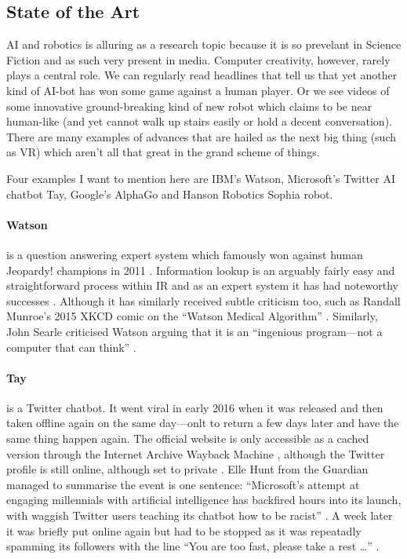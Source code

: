 \subsection{State of the Art}

\ac{AI} and robotics is alluring as a research topic because it is so prevelant in Science Fiction and as such very present in media. Computer creativity, however, rarely plays a central role. We can regularly read headlines that tell us that yet another kind of \ac{AI}-bot has won some game against a human player. Or we see videos of some innovative ground-breaking kind of new robot which claims to be near human-like (and yet cannot walk up stairs easily or hold a decent conversation). There are many examples of advances that are hailed as the next big thing (such as \ac{VR}) which aren't all that great in the grand scheme of things. 

Four examples I want to mention here are IBM's Watson, Microsoft's Twitter \ac{AI} chatbot Tay, Google's AlphaGo and Hanson Robotics Sophia robot.

\paragraph{Watson} is a question answering expert system which famously won against human Jeopardy! champions in 2011 \autocite{IBM2016}. Information lookup is an arguably fairly easy and straightforward process within \ac{IR} and as an expert system it has had noteworthy successes \autocite{Fingas2016}. Although it has similarly received subtle criticism too, such as Randall Munroe's 2015 XKCD comic on the ``Watson Medical Algorithm'' \citeyear{Munroe2016}. Similarly, John Searle criticised Watson arguing that it is an ``ingenious program---not a computer that can think'' \citeyear{Searle2016}.

\paragraph{Tay} is a Twitter chatbot. It went viral in early 2016 when it was released and then taken offline again on the same day---onlt to return a few days later and have the same thing happen again. The official website is only accessible as a cached version through the Internet Archive Wayback Machine \autocite{Tay2016}, although the Twitter profile is still online, although set to private \autocite{Tayandyou2016}. Elle Hunt from the Guardian managed to summarise the event is one sentence: ``Microsoft's attempt at engaging millennials with artificial intelligence has backfired hours into its launch, with waggish Twitter users teaching its chatbot how to be racist'' \autocite{Hunt2016}. A week later it was briefly put online again but had to be stopped as it was repeatadly spamming its followers with the line ``You are too fast, please take a rest \ldots'' \autocite{Gibbs2016}.

